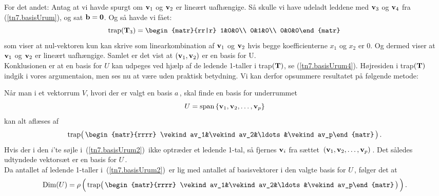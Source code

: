 For det andet: Antag at vi havde spurgt om $\mathbf{v}_1$ og $\mathbf{v}_2$ er lineært uafhængige. Så skulle vi have udeladt leddene med $\mathbf{v}_3$ og $\mathbf{v}_4$ fra (\ref{tn7.basisUrum}), og sat $\mathbf{b}=\bm{0}$. Og så havde vi fået:
$$\mathrm{trap}(\mT_3)=
\begin{matr}{rr|r}
1&0&0\\
0&1&0\\
0&0&0\end{matr}\,
$$
som viser at nul-vektoren kun kan skrive som linearkombination af $\mathbf{v}_1$ og $\mathbf{v}_2$ hvis begge koefficienterne $x_1$ og $x_2$ er 0. Og dermed viser at  $\mathbf{v}_1$ og $\mathbf{v}_2$ er lineært uafhængige. Samlet er det vist at $(\mathbf{v}_1,\mathbf{v}_2)$ er en basis for U.\\

Konklusionen er at en basis for $U$ kan udpeges ved hjælp af de ledende 1-taller i trap$(\mathbf{T})$, se (\ref{tn7.basisUrum4}). Højresiden i trap$(\mathbf{T})$ indgik i vores argumentaion, men ses nu at være uden praktisk betydning. Vi kan derfor opsummere resultatet på følgende metode:

\begin{method}\label{tn7.methodUdtynding}
Når man i et vektorrum $V$, hvori der er valgt en basis $a\,$, skal finde en basis for underrummet
$$U= \mathrm{span}\left\{\mathbf{v}_1,\mathbf{v}_2,\ldots,\mathbf{v}_p\right\}$$
kan alt aflæses af
\begin{equation}\label{tn7.basisUrum2}
\mathrm{trap}\big(\,\begin{matr}{rrrr}
\vekind av_1&\vekind av_2&\ldots&\vekind av_p\end{matr}\,\big)\,.
\end{equation}
Hvis der i den $i$'te søjle i \,(\ref{tn7.basisUrum2})\, ikke optræder et ledende 1-tal, så fjernes $\mathbf{v}_i$ fra sættet $\,(\mathbf{v}_1,\mathbf{v}_2,\ldots,\mathbf{v}_p)\,$. Det således udtyndede vektorsæt er en basis for $U\,$.\\

Da antallet af ledende 1-taller i \,(\ref{tn7.basisUrum2})\, er lig med antallet af basisvektorer i den valgte basis for $U\,$, følger det at 
\begin{equation}\label{tn7.basisUrum3}
\mathrm{Dim}(U)=\rho\,\Big(\,
\mathrm{trap}\big(\,\begin{matr}{rrrr}
\vekind av_1&\vekind av_2&\ldots&\vekind av_p\end{matr}\,\big)
\,\Big)\,.
\end{equation}
\end{method} 

